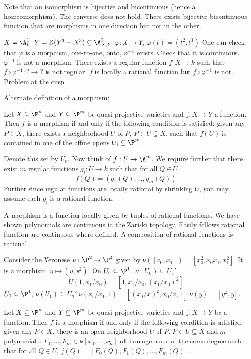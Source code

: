 Note that an isomorphism is bijective and bicontinuous (hence a homeomorphism). The converse does not hold. There exists bijective bicontinuous function that are morphisms in one direction but not in the other. 


\begin{ex}
$X= \A_t^1$, $Y= Z(Y^2-X^3) \subseteq \A_{X,Y}^2$
$\varphi: X \to Y$, $\varphi(t)= (t^2,t^3)$
One can check that $\varphi$ is a morphism, one-to-one, onto, $\varphi^{-1}$ exists. Check that it is continuous. $\varphi^{-1}$ is not a morphism. There exists a regular function $f: X \to k$ such that $f \circ \varphi^{-1}: ? \to ?$ is not regular. $f$ is locally a rational function but $f \circ \varphi^{-1}$ is not. Problem at the cusp.
\end{ex}

Alternate definition of a morphism: 

\begin{prop}
Let $X \subseteq \P^n$ and $Y \subseteq \P^m$ be quasi-projective varieties and $f: X \to Y$ a function. Then $f$ is a morphism if and only if the following condition is satisfied: given any $P \in X$, there exists a neighborhood $U$ of $P$, $P \in U \subseteq X$, such that $f(U)$ is contained in one of the affine opens $U_i \subseteq \P^m$. 
\end{prop}

Denote this set by $U_0$. Now think of $f: U \to \A^m$. We require further that there exist $m$ regular functions $g_i: U \to k$ such that for all $Q \in U$
	\[
	f(Q)= (g_1(Q),\ldots, g_m(Q))
	\]
Further since regular functions are locally rational by shrinking $U$, you may assume each $g_i$ is a rational function.


A morphism is a function locally given by tuples of rational functions. We have shown polynomials are continuous in the Zariski topology. Easily follows rational function are continuous where defined. A composition of rational functions is rational.

\begin{ex}
Consider the Veronese $\nu: \P^2 \to \P^2$ given by $\nu([x_0,x_1])= [x_0^2,x_0x_1,x_1^2]$. It is a morphism. $y \mapsto (y,y^2)$. On $U_0 \subseteq \P^1$, $\nu(U_0) \subseteq U_0'$
	\[
	U(1,x_1/x_0)= [1,x_1/x_0, (x_1/x_0)^2]
	\]
$U_1 \subseteq \P^1$, $\nu(U_1) \subseteq U_2'$
$\nu(x_0/x_1,1)= [(x_0/x)^2,x_0/x,1]$
$\nu(y)= [y^2,y]$.
\end{ex}


Let $X \subseteq \P^n$ and $Y \subseteq \P^m$ be quasi-projective varieties and $f: X \to Y$ be a function. Then $f$ is a morphism if and only if the following condition is satisfied: given any $P \in X$, there is an open neighborhood $U$ of $P$. $P \in U \subseteq X$ and $m$ polynomials. $F_0,\ldots,F_m \in k[x_0,\ldots,x_n]$ all homogeneous of the same degree such that for all $Q \in U$, $f(Q)= [F_0(Q), F_1(Q), \ldots, F_m(Q)]$. 



